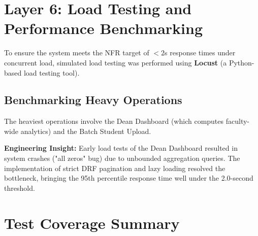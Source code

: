 \section{Layer 6: Load Testing and Performance Benchmarking}
\label{sec:layer6-load}

To ensure the system meets the NFR target of $<2$s response times under concurrent load, simulated load testing was performed using \textbf{Locust} (a Python-based load testing tool).

\subsection{Benchmarking Heavy Operations}

The heaviest operations involve the Dean Dashboard (which computes faculty-wide analytics) and the Batch Student Upload.

\begin{table}[H]
    \centering
    \renewcommand{\arraystretch}{1.3}
    \caption{Locust Load Testing Benchmarks}
\end{table}

\textbf{Engineering Insight:} Early load tests of the Dean Dashboard resulted in system crashes ("all zeros" bug) due to unbounded aggregation queries. The implementation of strict DRF pagination and lazy loading resolved the bottleneck, bringing the 95th percentile response time well under the 2.0-second threshold.

\section{Test Coverage Summary}
\label{sec:test-summary}

